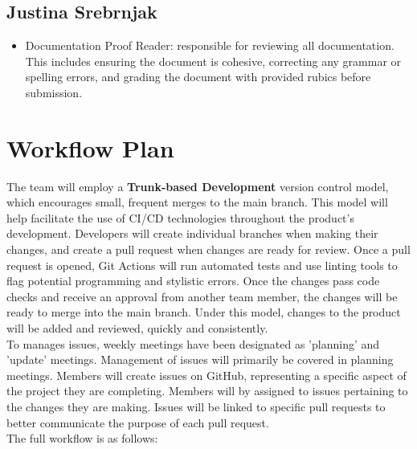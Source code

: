 \documentclass{article}
\begin{document}
\subsection{Justina Srebrnjak}

\begin{itemize}
	\item Documentation Proof Reader: responsible for reviewing all documentation. This includes ensuring the document is cohesive, correcting any grammar or spelling errors, and grading the document with provided rubics before submission.   
\end{itemize}

\section{Workflow Plan}

The team will employ a \textbf{Trunk-based Development} version control model, 
which encourages small, frequent merges to the main branch. This model will 
help facilitate the use of CI/CD technologies throughout the product's 
development. Developers will create individual branches when making their 
changes, and create a pull request when changes are ready for review. Once a 
pull request is opened, Git Actions will run automated tests and use linting 
tools to flag potential programming and stylistic errors. Once the changes pass 
code checks and receive an approval from another team member, the changes will 
be ready to merge into the main branch. Under this model, changes to the 
product will be added and reviewed, quickly and consistently.
\\

To manages issues, weekly meetings have been designated as 'planning' and 
'update' meetings. Management of issues will primarily be covered in planning 
meetings. Members will create issues on GitHub, representing a specific aspect 
of the project they are completing. Members will by assigned to issues 
pertaining to the changes they are making. Issues will be linked to specific 
pull requests to better communicate the purpose of each pull request.
\\

The full workflow is as follows:
\end{document}
